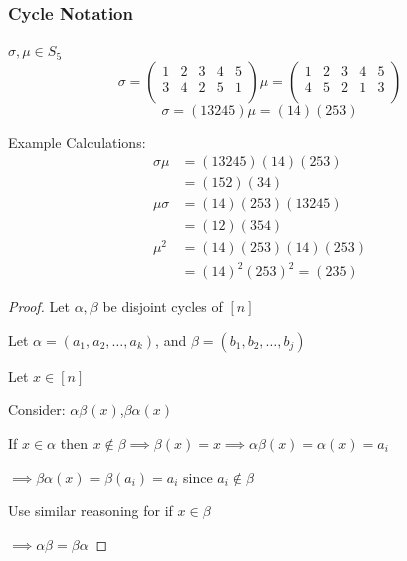 \subsubsection{Cycle Notation}
\begin{example}
    \(\sigma,\mu\in S_5\)
    \[\sigma=\left( 
    \begin{array}{ccccc}
    1 & 2 & 3 & 4 & 5 \\
    3 & 4 & 2 & 5 & 1\\
    \end{array}
    \right)
    \mu=\left( 
    \begin{array}{ccccc}
    1 & 2 & 3 & 4 & 5\\
    4 & 5 & 2 & 1 & 3\\
    \end{array}
    \right)
    \]
    \[
    \sigma=\left( 13245 \right)
    \mu=\left( 14 \right)\left( 253 \right)
    \]

    Example Calculations:
    \begin{align*}
        \sigma\mu &=\left( 13245 \right)\left( 14 \right)\left( 253 \right)\\
                  &=\left( 152 \right)\left( 34 \right)\\
        \mu\sigma &=\left( 14 \right)\left( 253 \right)\left( 13245 \right)\\
                  &=\left( 12 \right)\left( 354 \right)\\
        \mu^2     &=\left( 14 \right)\left( 253 \right)\left( 14 \right)\left( 253 \right)\\
                  &=\left( 14 \right)^2\left( 253 \right)^2=\left( 235 \right)
    \end{align*}
\end{example}
\begin{proof}
    Let \(\alpha,\beta\) be disjoint cycles of \([n]\)

    Let \(\alpha=\left( a_1,a_2,\dots,a_k \right)\), and \(\beta=\left( b_1,b_2,\dots,b_j \right)\)

    Let \(x\in[n]\)

    Consider: \(\alpha\beta(x)\),\(\beta\alpha(x)\)

    If \(x\in\alpha\) then \(x\notin\beta \implies \beta(x)=x\implies\alpha\beta(x)=\alpha(x)=a_i\)
                      
    \hspace*{2.28in}  \(\implies \beta\alpha(x)=\beta(a_i)=a_i\) since \(a_i \notin \beta\)

    Use similar reasoning for if \(x\in\beta\)

    \(\implies \alpha\beta=\beta\alpha\)
\end{proof}

